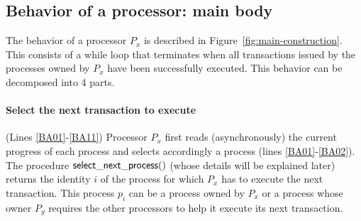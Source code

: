 \begin{figure}[h!]
\end{figure}


\subsection{Behavior of a processor: main body}
The behavior of a processor $P_x$ is described in 
Figure~\ref{fig:main-construction}. This  consists of a while loop
that   terminates   when all transactions  issued by the processes owned by
$P_x$ have  been successfully   executed. This  behavior can  be decomposed
into 4 parts. 



\paragraph{Select the next transaction to execute} 
(Lines \ref{BA01}-\ref{BA11}) 
Processor $P_x$  first reads (asynchronously) the current  progress of each
process  and  selects accordingly   a process (lines  \ref{BA01}-\ref{BA02}). 
The procedure ${\sf select\_next\_process}()$  (whose details will be explained
later) returns  the identity $i$ of the process for which $P_x$ has to 
execute the next transaction. This process  $p_i$ can be a process owned by
$P_x$ or a process whose owner $P_y$ requires the other processors to help it
execute its next transaction.


